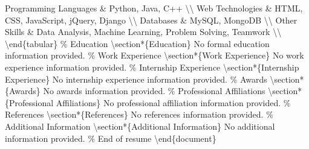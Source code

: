 \documentclass{article}%
\begin{document}
Programming Languages \& Python, Java, C++ \textbackslash{}\textbackslash{}\newline%
Web Technologies \& HTML, CSS, JavaScript, jQuery, Django \textbackslash{}\textbackslash{}\newline%
Databases \& MySQL, MongoDB \textbackslash{}\textbackslash{}\newline%
Other Skills \& Data Analysis, Machine Learning, Problem Solving, Teamwork \textbackslash{}\textbackslash{}\newline%
\textbackslash{}end\{tabular\}\newline%
\newline%
\% Education\newline%
\textbackslash{}section*\{Education\}\newline%
No formal education information provided.\newline%
\newline%
\% Work Experience\newline%
\textbackslash{}section*\{Work Experience\}\newline%
No work experience information provided.\newline%
\newline%
\% Internship Experience\newline%
\textbackslash{}section*\{Internship Experience\}\newline%
No internship experience information provided.\newline%
\newline%
\% Awards\newline%
\textbackslash{}section*\{Awards\}\newline%
No awards information provided.\newline%
\newline%
\% Professional Affiliations\newline%
\textbackslash{}section*\{Professional Affiliations\}\newline%
No professional affiliation information provided.\newline%
\newline%
\% References\newline%
\textbackslash{}section*\{References\}\newline%
No references information provided.\newline%
\newline%
\% Additional Information\newline%
\textbackslash{}section*\{Additional Information\}\newline%
No additional information provided.\newline%
\newline%
\% End of resume\newline%
\textbackslash{}end\{document\}%
\end{document}
